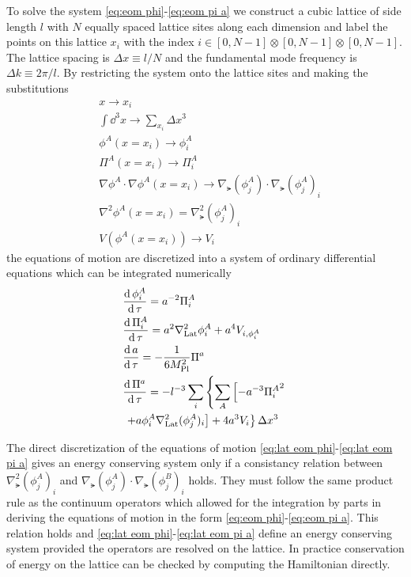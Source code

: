 To solve the system \eqref{eq:eom phi}-\eqref{eq:eom pi a} we construct a cubic lattice of side length $l$ with $N$ equally spaced lattice sites along each dimension and label the points on this lattice $x_i$ with the index $i\in[0,N-1]\otimes[0,N-1]\otimes[0,N-1]$.
The lattice spacing is $\Delta x \equiv l/N$ and the fundamental mode frequency is $\Delta k \equiv 2\pi/l$.
By restricting the system onto the lattice sites and making the substitutions
\begin{align}
  & x \to x_i \label{eq:lat sub1}\\
  & \int\dd^3x \to \sum_{x_i}\Delta x^3 \\
  & \phi^A(x=x_i) \to \phi^A_i \\
  & \Pi^A(x=x_i) \to \Pi^A_i \\
  & \nabla\phi^A\cdot\nabla\phi^A(x=x_i) \to \nabla_\lat(\phi^A_j)\cdot\nabla_\lat(\phi^A_j)_i \\
  & \nabla^2\phi^A(x=x_i) = \nabla^2_\lat(\phi^A_j)_i \\
  & V(\phi^A(x=x_i)) \to V_i \label{eq:lat sub7}
\end{align}
the equations of motion are discretized into a system of ordinary differential equations which can be integrated numerically
\begin{align}
  & \frac{\mathrm{d}\,\phi^A_i}{\mathrm{d}\,\tau} = a^{-2}\Pi^A_i \label{eq:lat eom phi} \\
  & \frac{\mathrm{d}\,\Pi^A_i}{\mathrm{d}\,\tau} = a^2\nabla^2_{\mathrm{Lat}}\phi^A_i + a^4V_{i,\phi^A_i} \\
  & \frac{\mathrm{d}\, a}{\mathrm{d}\,\tau} = -\frac{1}{6M_{\mathrm{Pl}}^2}\Pi^a \\
  & \frac{\mathrm{d}\,\Pi^a}{\mathrm{d}\,\tau} = -l^{-3}\sum_i\left\{
  \sum_A\left[-a^{-3}{\Pi^A_i}^2 \right. \right. \\
    & \left. \left. + a\phi^A_i\nabla^2_{\mathrm{Lat}}(\phi^A_j)_i \right] +4a^3V_i
  \right\}\Delta x^3 \label{eq:lat eom pi a}
\end{align}

The direct discretization of the equations of motion \eqref{eq:lat eom phi}-\eqref{eq:lat eom pi a} gives an energy conserving system only if a consistancy relation between $\nabla^2_\lat(\phi^A_j)_i$ and $\nabla_\lat(\phi^A_j)\cdot\nabla_\lat(\phi^B_j)_i$ holds.
They must follow the same product rule as the continuum operators which allowed for the integration by parts in deriving the equations of motion in the form \eqref{eq:eom phi}-\eqref{eq:eom pi a}.
This relation holds and \eqref{eq:lat eom phi}-\eqref{eq:lat eom pi a} define an energy conserving system provided the operators are resolved on the lattice.
In practice conservation of energy on the lattice can be checked by computing the Hamiltonian directly.

